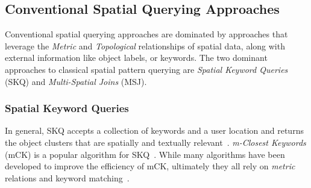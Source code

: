 \subsection{Conventional Spatial Querying Approaches}

\par{
    Conventional spatial querying approaches are dominated by approaches that leverage the \textit{Metric} and \textit{Topological} relationships of spatial data, along with external information like object labels, or keywords. 
    The two dominant approaches to classical spatial pattern querying are \textit{Spatial Keyword Queries} (SKQ) and \textit{Multi-Spatial Joins} (MSJ).} 
\subsubsection{Spatial Keyword Queries}
\par{
    In general, SKQ accepts a collection of keywords and a user location and returns the object clusters that are spatially and textually relevant~\cite{Cao2012}.
    \textit{m-Closest Keywords} (mCK) is a popular algorithm for SKQ~\cite{Zhang2009}.
    While many algorithms have been developed to improve the efficiency of mCK, ultimately they all rely on \textit{metric} relations and keyword matching~\cite{Guo2015}. 
    }
